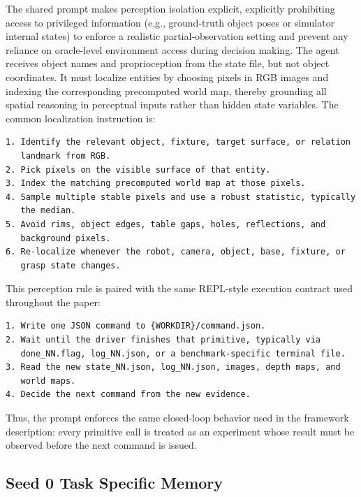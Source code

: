 \documentclass[11pt]{article}
\begin{document}
The shared prompt makes perception isolation explicit, explicitly prohibiting access to privileged information (e.g., ground-truth object poses or simulator internal states) to enforce a realistic partial-observation setting and prevent any reliance on oracle-level environment access during decision making. The agent receives object names and proprioception from the state file, but not object coordinates. It must localize entities by choosing pixels in RGB images and indexing the corresponding precomputed world map, thereby grounding all spatial reasoning in perceptual inputs rather than hidden state variables. The common localization instruction is:


\begin{samepage}
\begin{lstlisting}[frame=single,framerule=0.5pt]
1. Identify the relevant object, fixture, target surface, or relation
   landmark from RGB.
2. Pick pixels on the visible surface of that entity.
3. Index the matching precomputed world map at those pixels.
4. Sample multiple stable pixels and use a robust statistic, typically
   the median.
5. Avoid rims, object edges, table gaps, holes, reflections, and
   background pixels.
6. Re-localize whenever the robot, camera, object, base, fixture, or
   grasp state changes.
\end{lstlisting}
\end{samepage}

This perception rule is paired with the same REPL-style execution contract used
throughout the paper:

\begin{samepage}
\begin{lstlisting}[frame=single,framerule=0.5pt]
1. Write one JSON command to {WORKDIR}/command.json.
2. Wait until the driver finishes that primitive, typically via
   done_NN.flag, log_NN.json, or a benchmark-specific terminal file.
3. Read the new state_NN.json, log_NN.json, images, depth maps, and
   world maps.
4. Decide the next command from the new evidence.
\end{lstlisting}
\end{samepage}

Thus, the prompt enforces the same closed-loop behavior used in the framework
description: every primitive call is treated as an experiment whose result must be
observed before the next command is issued.

\subsection{Seed 0 Task Specific Memory}
\label{app:agent_prompt:task_specific_memory}
\end{document}
